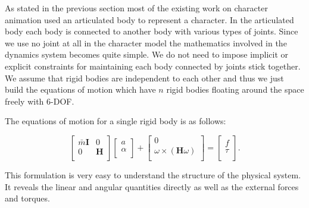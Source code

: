 \documentclass[master,english,final]{kaist-ucs}
\begin{document}
As stated in the previous section most of the existing work on
character animation used an articulated body to represent a character.
In the articulated body each body is connected to another body with
various types of joints. Since we use no joint at all in the character
model the mathematics involved in the dynamics system becomes quite
simple. We do not need to impose implicit or explicit constraints for
maintaining each body connected by joints stick together.
We assume that rigid bodies are independent to each other and thus we just build the
equations of motion which have $n$ rigid bodies floating around the
space freely with 6-DOF.

The equations of motion for a single rigid body is as follows:

\begin{equation}
\left[ {\begin{array}{cc}
 \bar{m}\mathbf{I}  &  0 \\
 0            & \mathbf{H}  \\
 \end{array} } \right]
 \left[ {\begin{array}{c}
 a  \\
 \alpha              \\
 \end{array} } \right]
 +
 \left[ {\begin{array}{c}
 0  \\
 \omega\times(\mathbf{H}\omega)   \\
 \end{array} } \right]
 =
 \left[ {\begin{array}{c}
 f  \\
 \tau   \\
 \end{array} } \right].
\end{equation}

This formulation is very easy to understand the structure of
the physical system. It reveals the linear and angular quantities
directly as well as the external forces and torques.
\end{document}
